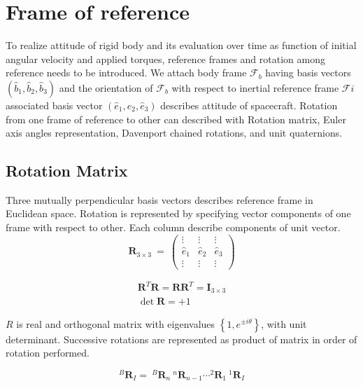 \section{Frame of reference}
To realize attitude of rigid body and its evaluation over time as function of initial angular velocity and applied torques, reference frames and rotation among reference needs to be introduced. We attach body frame $ \mathcal{F}_{b}$ having basis vectors $ (\hat{b}_{1} ,\hat{b}_{2} ,\hat{b}_{3})$ and the orientation of $ \mathcal{F}_{b}$ with respect to inertial reference frame $ \mathcal{F} i$ associated basis vector $ (\hat{e}_{1} ,\hat{e}_{2} ,\hat{e}_{3})$ describes attitude of spacecraft. Rotation from one frame of reference to other can described with Rotation matrix, Euler axis angles representation, Davenport chained rotations, and unit quaternions.

\subsection{Rotation Matrix}
Three mutually perpendicular basis vectors describes reference frame in Euclidean space. Rotation is represented by specifying vector components of one frame with respect to other. Each column describe components of unit vector.
\begin{equation}
\mathbf{R}_{3\times 3} \ =\ \begin{pmatrix}
\vdots  & \vdots  & \vdots \\
\hat{e}_{1} & \hat{e}_{2} & \hat{e}_{3}\\
\vdots  & \vdots  & \vdots 
\end{pmatrix}
\end{equation}

\begin{equation}
\begin{aligned}
\mathbf{R}^{T}\mathbf{R} =\mathbf{RR}^{T} =\mathbf{I}_{3\times 3}\\
\det\mathbf{R} =+1
\end{aligned}
\label{eqn:rotmat}
\end{equation}

\noindent $ R$ is real and orthogonal matrix with eigenvalues $ \left\{1,e^{\pm i\theta }\right\}$, with unit determinant. Successive rotations are represented as product of matrix in order of rotation performed.


\begin{equation}
^{B}\mathbf{R}_{I} =\ ^{B}\mathbf{R}_{n} \ ^{n}\mathbf{R}_{n-1} \cdots ^{2}\mathbf{R}_{1} \ ^{1}\mathbf{R}_{I}
\end{equation}

